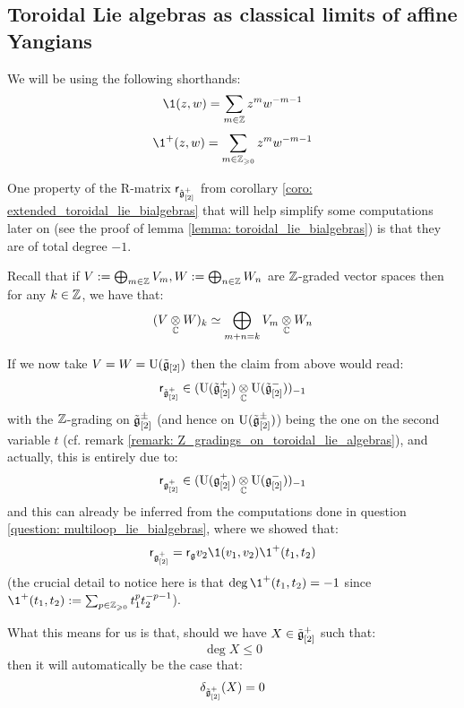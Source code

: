         \subsection{Toroidal Lie algebras as classical limits of affine Yangians}
            \begin{convention}
                We will be using the following shorthands:
                    $$\1(z, w) = \sum_{m \in \Z} z^m w^{-m - 1}$$
                    $$\1^+(z, w) = \sum_{m \in \Z_{\geq 0}} z^m w^{-m - 1}$$
            \end{convention}

            \begin{remark} \label{remark: total_degrees_of_classical_yangian_R_matrices}
                One property of the R-matrix $\mathsf{r}_{\hat{\mathfrak{g}}_{[2]}^+}$ from corollary \ref{coro: extended_toroidal_lie_bialgebras} that will help simplify some computations later on (see the proof of lemma \ref{lemma: toroidal_lie_bialgebras}) is that they are of total degree $-1$. 

                Recall that if $V := \bigoplus_{m \in \mathbb{Z}} V_m, W := \bigoplus_{n \in \mathbb{Z}} W_n$ are $\mathbb{Z}$-graded vector spaces then for any $k \in \mathbb{Z}$, we have that:
                    $$(V \tensor_{\bbC} W)_k \cong \bigoplus_{m + n = k} V_m \tensor_{\bbC} W_n$$
                    
                If we now take $V = W = \mathrm{U}(\tilde{\mathfrak{g}}_{[2]})$ then the claim from above would read:
                    $$\sfr_{\tilde{\g}_{[2]}^+} \in ( \rmU(\tilde{\g}_{[2]}^+) \tensor_{\bbC} \rmU(\tilde{\g}_{[2]}^-) )_{-1}$$
                with the $\mathbb{Z}$-grading on $\tilde{\mathfrak{g}}_{[2]}^{\pm}$ (and hence on $\mathrm{U}(\tilde{\mathfrak{g}}_{[2]}^{\pm})$) being the one on the second variable $t$ (cf. remark \ref{remark: Z_gradings_on_toroidal_lie_algebras}), and actually, this is entirely due to:
                    $$\sfr_{\g_{[2]}^+} \in ( \rmU(\g_{[2]}^+) \tensor_{\bbC} \rmU(\g_{[2]}^-) )_{-1}$$
                and this can already be inferred from the computations done in question \ref{question: multiloop_lie_bialgebras}, where we showed that:
                    $$\sfr_{\g_{[2]}^+} = \sfr_{\g} v_2 \1(v_1, v_2) \1^+(t_1, t_2)$$
                (the crucial detail to notice here is that $\deg \1^+(t_1, t_2) = -1$ since $\1^+(t_1, t_2) := \sum_{p \in \Z_{\geq 0}} t_1^p t_2^{-p - 1}$).

                What this means for us is that, should we have $X \in \tilde{\mathfrak{g}}_{[2]}^+$ such that:
                    $$\deg X \leq 0$$
                then it will automatically be the case that:
                    $$\delta_{\tilde{\mathfrak{g}}_{[2]}^+}(X) = 0$$
            \end{remark}
            
